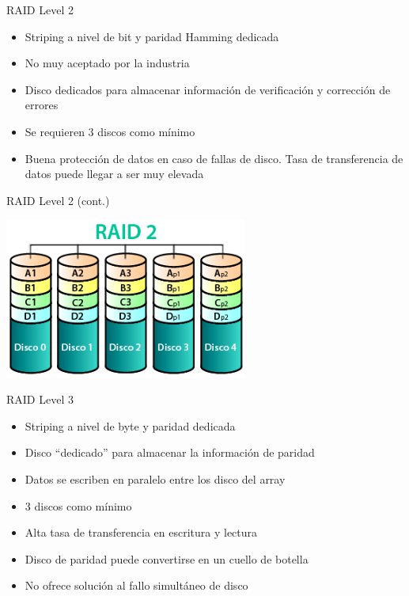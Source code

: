 \begin{frame}{RAID Level 2}
 \begin{itemize}
  \item Striping a nivel de bit y paridad Hamming dedicada
  \item No muy aceptado por la industria
  \item Disco dedicados para almacenar información de verificación y corrección de errores
  \item Se requieren 3 discos como mínimo
  \item Buena protección de datos en caso de fallas de disco. Tasa de transferencia de datos puede llegar a ser muy elevada
 \end{itemize}
\end{frame}

\begin{frame}{RAID Level 2 (cont.)}
 \begin{center}
  \includegraphics[width=0.6\textwidth]{images/raid2.png}
 \end{center}
\end{frame}

\begin{frame}{RAID Level 3}
 \begin{itemize}
  \item Striping a nivel de byte y paridad dedicada
  \item Disco “dedicado” para almacenar la información de paridad
  \item Datos se escriben en paralelo entre los disco del array
  \item 3 discos como mínimo
  \item Alta tasa de transferencia en escritura y lectura
  \item Disco de paridad puede convertirse en un cuello de botella  
  \item No ofrece solución al fallo simultáneo de disco
 \end{itemize}
\end{frame}

